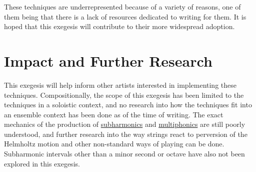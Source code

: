 These techniques are underrepresented because of a variety of reasons, one of them being that there is a lack of resources dedicated to writing for them.
It is hoped that this exegesis will contribute to their more widespread adoption. 

\section{Impact and Further Research}
This exegesis will help inform other artists interested in implementing these techniques. 
Compositionally, the scope of this exegesis has been limited to the techniques in a soloistic context, and no research into how the techniques fit into an ensemble context has been done as of the time of writing.
The exact mechanics of the production of \hyperref[sec:subharmonics]{subharmonics} and \hyperref[sec:multiphonics]{multiphonics} are still poorly understood, and further research into the way strings react to perversion of the Helmholtz motion and other non-standard ways of playing can be done.
Subharmonic intervals other than a minor second or octave have also not been explored in this exegesis.